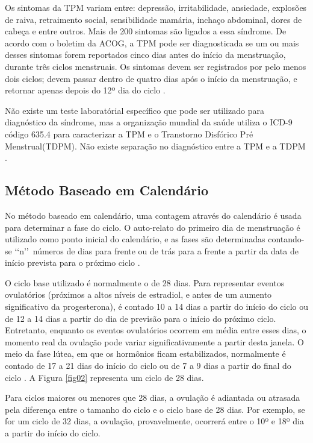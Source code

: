 Os sintomas da TPM variam entre: depressão, irritabilidade, ansiedade, 
explosões de raiva, retraimento social, sensibilidade mamária, 
inchaço abdominal, dores de cabeça e entre outros. Mais de 200 sintomas 
são ligados a essa síndrome. De acordo com o boletim da ACOG, a TPM pode 
ser diagnosticada se um ou mais desses sintomas forem reportados cinco dias 
antes do início da menstruação, durante três ciclos menstruais. Os sintomas 
devem ser registrados por pelo menos dois ciclos; devem passar dentro de 
quatro dias após o início da menstruação, e retornar apenas depois do 12º dia do 
ciclo \cite{ACOG2000}.

Não existe um teste laboratórial específico que pode ser utilizado para 
diagnóstico da síndrome, mas a organização mundial da saúde utiliza o ICD-9 
código 635.4 para caracterizar a TPM e o Transtorno Disfórico Pré Menstrual(TDPM). 
Não existe separação no diagnóstico entre a TPM e a TDPM \cite{biggs2011}.

\subsection{Método Baseado em Calendário}


No método baseado em calendário, uma contagem através do calendário é usada para determinar 
a fase do ciclo. O auto-relato do primeiro dia de menstruação é 
utilizado como ponto inicial do calendário, e as fases são determinadas 
contando-se \lq \lq n\rq \rq \ números de dias para frente ou de trás para 
a frente a partir da data de início prevista para o próximo ciclo \cite{wideman2013}.

O ciclo base utilizado é normalmente o de 28 dias. Para representar eventos
ovulatórios (próximos a altos níveis de estradiol, e antes de um aumento significativo da
progesterona), é contado 10 a 14 dias a partir do início do ciclo ou de 12 a 14 dias a partir do
dia de previsão para o início do próximo ciclo. Entretanto, enquanto os eventos ovulatórios ocorrem
em média entre esses dias, o momento real da ovulação pode variar significativamente
a partir desta janela. O meio da fase lútea, em que os hormônios ficam 
estabilizados, normalmente é contado de 17 a 21 dias do início do ciclo 
ou de 7 a 9 dias a partir do final do ciclo \cite{wideman2013}. 
A Figura \ref{fig02} representa um ciclo de 28 dias.

Para ciclos maiores ou 
menores que 28 dias, a ovulação é adiantada ou atrasada pela diferença 
entre o tamanho do ciclo e o ciclo base de 28 dias. Por exemplo, se for 
um ciclo de 32 dias, a ovulação, provavelmente, ocorrerá entre o 10º e 18º dia 
a partir do início do ciclo.

